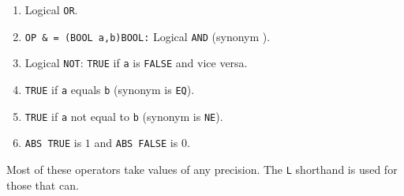\begin{enumerate}
\item {}\newline
Logical \verb|OR|.
\item \verb|OP & = (BOOL a,b)BOOL:|\newline
Logical \verb|AND| (synonym ).
\item {}\newline
Logical \verb|NOT|: \verb|TRUE| if \verb|a| is \verb|FALSE| and vice
versa.
\item {}\newline
\verb|TRUE| if \verb|a| equals \verb|b| (synonym is \verb|EQ|).
\item {}\newline
\verb|TRUE| if \verb|a| not equal to \verb|b| (synonym is \verb|NE|).
\item {}\newline
\verb|ABS TRUE| is $1$ and \verb|ABS FALSE| is $0$.
\end{enumerate}

Most of these operators take values of any precision. The \verb|L|
shorthand is used for those that can.

